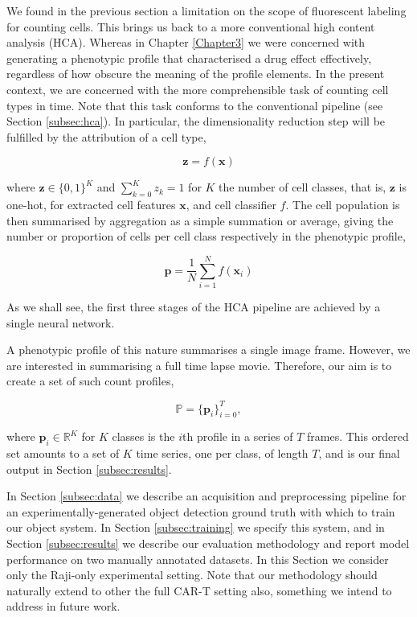 We found in the previous section a limitation on the scope of fluorescent labeling for counting cells. This brings us back to a more conventional high content analysis (HCA). Whereas in Chapter \ref{Chapter3} we were concerned with generating a phenotypic profile that characterised a drug effect effectively, regardless of how obscure the meaning of the profile elements. In the present context, we are concerned with the more comprehensible task of counting cell types in time. Note that this task conforms to the conventional pipeline (see Section \ref{subsec:hca}). In particular, the dimensionality reduction step will be fulfilled by the attribution of a cell type,

\begin{equation}
\mathbf{z} = f(\mathbf{x})
\end{equation}

where $\mathbf{z} \in \{0, 1\}^K$ and $\sum_{k=0}^K z_k = 1$ for $K$ the number of cell classes, that is, $\mathbf{z}$ is one-hot, for extracted cell features $\mathbf{x}$, and cell classifier $f$. The cell population is then summarised by aggregation as a simple summation or average, giving the number or proportion of cells per cell class respectively in the phenotypic profile,

\begin{equation}
\mathbf{p} = \frac{1}{N}\sum_{i=1}^N f(\mathbf{x}_i)
\end{equation}

As we shall see, the first three stages of the HCA pipeline are achieved by a single neural network.

A phenotypic profile of this nature summarises a single image frame. However, we are interested in summarising a full time lapse movie. Therefore, our aim is to create a set of such count profiles,

\begin{equation}
\mathbb{P} = \{\mathbf{p}_i\}_{i=0}^{T},
\end{equation}

where $\mathbf{p}_i \in \mathbb{R}^K$ for $K$ classes is the $i$th profile in a series of $T$ frames. This ordered set amounts to a set of $K$ time series, one per class, of length $T$, and is our final output in Section \ref{subsec:results}.

In Section \ref{subsec:data} we describe an acquisition and preprocessing pipeline for an experimentally-generated object detection ground truth with which to train our object system. In Section \ref{subsec:training} we specify this system, and in Section \ref{subsec:results} we describe our evaluation methodology and report model performance on two manually annotated datasets. In this Section we consider only the Raji-only experimental setting. Note that our methodology should naturally extend to other the full CAR-T setting also, something we intend to address in future work.

